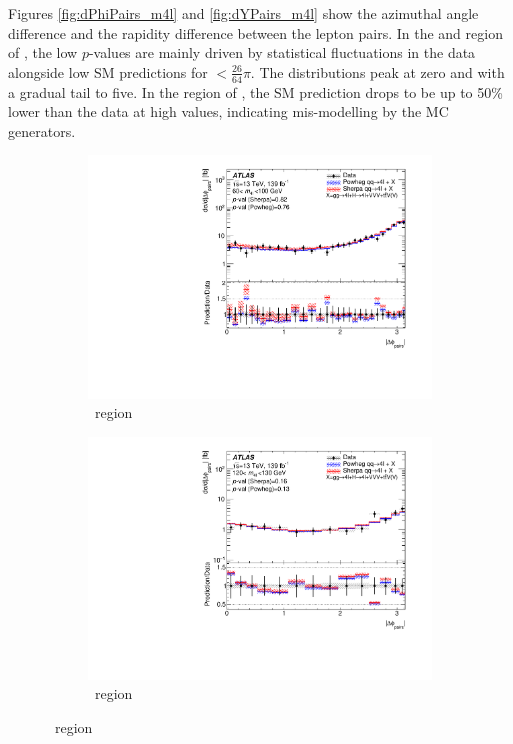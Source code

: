 Figures \ref{fig:dPhiPairs_m4l} and \ref{fig:dYPairs_m4l} show the azimuthal angle difference and the rapidity difference between the lepton pairs. In the \offshellZZ{} and \onshellZZ{} region of \dPhiPairs{}, the low $p$-values are mainly driven by statistical fluctuations in the data alongside low SM predictions for \dPhiPairs{}$<\frac{26}{64}\pi$. The \dYPairs{} distributions peak at zero and with a gradual tail to five. In the \onshellZZ{} region of \dYPairs{}, the SM prediction drops to be up to 50\% lower than the data at high values, indicating mis-modelling by the MC generators. 
\begin{figure}[htb!]
    \begin{subfigure}{.49\textwidth}\centering
      \includegraphics[width=.99\linewidth]{Figures/m4l/UnfoldedResults/Unfolded_Data_deltaPhiPairs_m4l60-100.pdf}\caption{\ZFourL \ region}\label{fig:sub-first}
    \end{subfigure}
    \begin{subfigure}{.49\textwidth}\centering
      \includegraphics[width=.99\linewidth]{Figures/m4l/UnfoldedResults/Unfolded_Data_deltaPhiPairs_m4l120-130.pdf} \caption{\HFourL \ region}\label{fig:sub-second}

\end{subfigure}
\end{figure}

